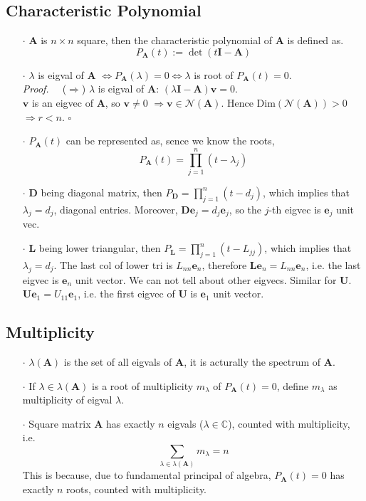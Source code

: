 \documentclass[a4paper, 11pt]{article}
\begin{document}
\subsection{Characteristic Polynomial}
\begin{itemize}
  \item[$\cdot$] $\pmb{A}$ is $n\times n$ square, then the characteristic polynomial of $\pmb{A}$ is defined as.
  $$
  P_{\pmb{A}}(t):=\det(t \pmb{I} - \pmb{A})
  $$
  \item[$\cdot$]$\lambda$ is eigval of $\pmb{A}$ $\iff P_{\pmb{A}}(\lambda) = 0\iff \lambda$ is root of $P_{\pmb{A}}(t)=0$.\\
  \textit{Proof.~~} ($\Rightarrow$) $\lambda$ is eigval of $\pmb{A}$: $(\lambda \pmb{I}-\pmb{A})\pmb{v}=0$. \\
  $\pmb{v}$ is an eigvec of $\pmb{A}$, so $\pmb{v}\ne 0$ $\Rightarrow \pmb{v}\in \mathcal{N}(\pmb{A})$.
  Hence $\text{Dim}(\mathcal{N}(\pmb{A}))>0$ $\Rightarrow r<n$. $\square$

  \item[$\cdot$] $P_{\pmb{A}}(t)$ can be represented as, sence we know the roots, 
  $$
  P_{\pmb{A}}(t) = \prod_{j=1}^n (t- \lambda_j)
  $$
  \item[$\cdot$] $\pmb{D}$ being diagonal matrix, then $P_{\pmb{D}} = \prod_{j=1}^n (t- d_j)$, which implies that $\lambda_j = d_j$, diagonal entries. Moreover, $\pmb{D}\pmb{e}_j = d_j \pmb{e}_j$, so the $j$-th eigvec is $\pmb{e}_j$ unit vec.
  \item[$\cdot$] $\pmb{L}$ being lower triangular, then $P_{\pmb{L}} = \prod_{j=1}^n (t- L_{jj})$, which implies that $\lambda_j = d_j$. The last col of lower tri is $L_{nn} \pmb{e}_n$, therefore $\pmb{L}\pmb{e}_n = L_{nn}\pmb{e}_n$, i.e. the last eigvec is $\pmb{e}_n$ unit vector. We can not tell about other eigvecs. Similar for $\pmb{U}$. $\pmb{U}\pmb{e}_1 = U_{11}\pmb{e}_1$, i.e. the first eigvec of $\pmb{U}$ is $\pmb{e}_1$ unit vector.
\end{itemize}

\subsection{Multiplicity}
\begin{itemize}
  \item[$\cdot$] $\lambda(\pmb{A})$ is the set of all eigvals of $\pmb{A}$, it is acturally the spectrum of $\pmb{A}$.
  \item[$\cdot$] If $\lambda \in \lambda(\pmb{A})$ is a root of multiplicity $m_{\lambda}$ of $P_{\pmb{A}}(t)=0$, define $m_{\lambda}$ as multiplicity of eigval $\lambda$.
  \item[$\cdot$] Square matrix $\pmb{A}$ has exactly $n$ eigvals ($\lambda\in \mathbb{C}$), counted with multiplicity, i.e.
  $$
  \sum_{\lambda \in \lambda(\pmb{A})} m_{\lambda} = n
  $$
  This is because, due to fundamental principal of algebra, $P_{\pmb{A}}(t)=0$ has exactly $n$ roots, counted with multiplicity.
\end{itemize}
\end{document}
